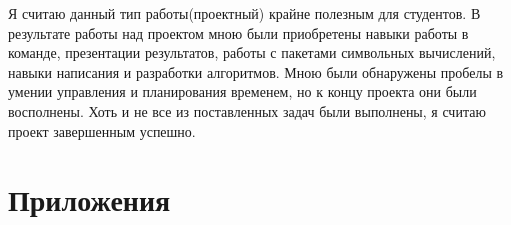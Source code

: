 \documentclass{article}
\begin{document}
Я считаю данный тип работы(проектный) крайне полезным для студентов. В результате работы над проектом мною были приобретены навыки работы в команде, презентации результатов, работы с пакетами символьных вычислений, навыки написания и разработки алгоритмов. Мною были обнаружены пробелы в умении управления и планирования временем, но к концу проекта они были восполнены. Хоть и не все из поставленных задач были выполнены, я считаю проект завершенным успешно.



\newpage




\newpage

\section*{Приложения}
\end{document}
